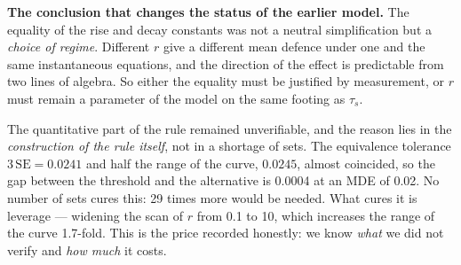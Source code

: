 \textbf{The conclusion that changes the status of the earlier model.} The equality of the rise and decay constants was not a neutral simplification but a \emph{choice of regime}. Different $r$ give a different mean defence under one and the same instantaneous equations, and the direction of the effect is predictable from two lines of algebra. So either the equality must be justified by measurement, or $r$ must remain a parameter of the model on the same footing as $\tau_s$.

\begin{note}
The quantitative part of the rule remained unverifiable, and the reason lies in the \emph{construction of the rule itself}, not in a shortage of sets. The equivalence tolerance $3\,\mathrm{SE}=0.0241$ and half the range of the curve, $0.0245$, almost coincided, so the gap between the threshold and the alternative is 0.0004 at an MDE of 0.02. No number of sets cures this: 29 times more would be needed. What cures it is leverage --- widening the scan of $r$ from 0.1 to 10, which increases the range of the curve 1.7-fold. This is the price recorded honestly: we know \emph{what} we did not verify and \emph{how much} it costs.
\end{note}
